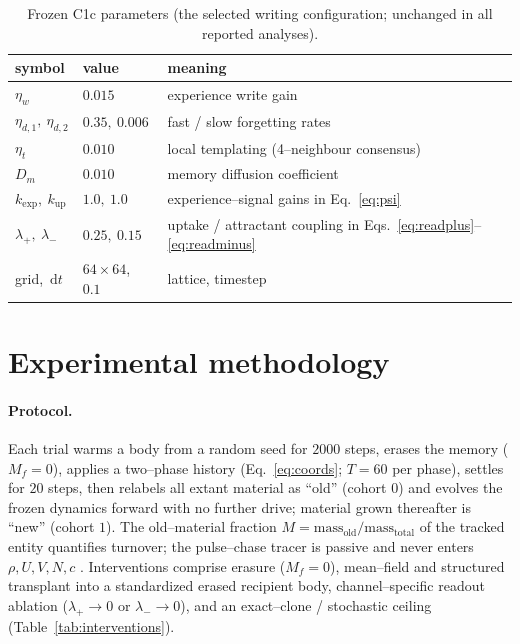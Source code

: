 \documentclass[11pt]{article}
\begin{document}
\begin{table}[t]\centering\small
\caption{Frozen C1c parameters (the selected writing configuration; unchanged in all reported analyses).}
\label{tab:params}
\begin{tabular}{@{}lll@{}}\toprule
symbol & value & meaning\\\midrule
$\eta_w$ & $0.015$ & experience write gain\\
$\eta_{d,1},\ \eta_{d,2}$ & $0.35,\ 0.006$ & fast / slow forgetting rates\\
$\eta_t$ & $0.010$ & local templating (4--neighbour consensus)\\
$D_m$ & $0.010$ & memory diffusion coefficient\\
$k_{\exp},\ k_{\mathrm{up}}$ & $1.0,\ 1.0$ & experience--signal gains in Eq.~\eqref{eq:psi}\\
$\lambda_+,\ \lambda_-$ & $0.25,\ 0.15$ & uptake / attractant coupling in Eqs.~\eqref{eq:readplus}--\eqref{eq:readminus}\\
grid,\ $\mathrm{d}t$ & $64\times64$,\ $0.1$ & lattice, timestep\\\bottomrule
\end{tabular}
\end{table}

\section{Experimental methodology}
\label{sec:methods}
\paragraph{Protocol.} Each trial warms a body from a random seed for $2000$ steps, erases the memory
($M_f=0$), applies a two--phase history (Eq.~\ref{eq:coords}; $T=60$ per phase), settles for $20$ steps, then
relabels all extant material as ``old'' (cohort $0$) and evolves the frozen dynamics forward with no further
drive; material grown thereafter is ``new'' (cohort $1$). The old--material fraction
$M=\text{mass}_{\text{old}}/\text{mass}_{\text{total}}$ of the tracked entity quantifies turnover; the pulse--chase
tracer is passive and never enters $\rho,U,V,N,c$ \citep{jaqaman2008}. Interventions comprise erasure ($M_f=0$),
mean--field and structured transplant into a standardized erased recipient body, channel--specific readout ablation
($\lambda_+\!\to\!0$ or $\lambda_-\!\to\!0$), and an exact--clone / stochastic ceiling (Table~\ref{tab:interventions}).
\end{document}

